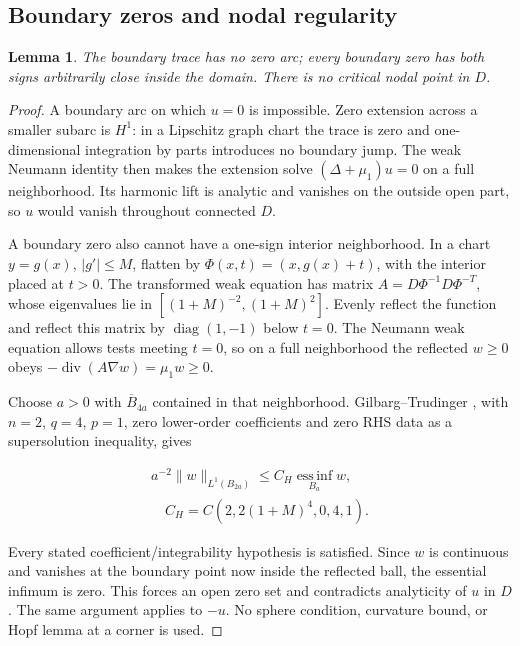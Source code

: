 \documentclass[11pt]{article}
\newtheorem{lemma}[theorem]{Lemma}
\theoremstyle{definition}
\theoremstyle{remark}
\numberwithin{equation}{section}
\begin{document}
\subsection{Boundary zeros and nodal regularity}\label{subsec:12.2}
\begin{lemma}\label{lem:boundary-zeros}
The boundary trace has no zero arc; every boundary zero has both signs arbitrarily close inside the domain. There is no critical nodal point in $D$.
\end{lemma}
\begin{proof}

A boundary arc on which $u=0$ is impossible. Zero extension across a smaller subarc is $H^1$: in a Lipschitz graph chart the trace is zero and one-dimensional integration by parts introduces no boundary jump. The weak Neumann identity then makes the extension solve $(\Delta+\mu_1)u=0$ on a full neighborhood. Its harmonic lift is analytic and vanishes on the outside open part, so $u$ would vanish throughout connected $D$.

A boundary zero also cannot have a one-sign interior neighborhood. In a chart $y=g(x)$, $|g'|\le M$, flatten by $\Phi(x,t)=(x,g(x)+t)$, with the interior placed at $t>0$. The transformed weak equation has matrix $A=D\Phi^{-1}D\Phi^{-T}$, whose eigenvalues lie in $[(1+M)^{-2},(1+M)^2]$. Evenly reflect the function and reflect this matrix by $\operatorname{diag}(1,-1)$ below $t=0$. The Neumann weak equation allows tests meeting $t=0$, so on a full neighborhood the reflected $w\ge0$ obeys $-\operatorname{div}(A\nabla w)=\mu_1w\ge0$.

Choose $a>0$ with $\overline B_{4a}$ contained in that neighborhood. Gilbarg--Trudinger \cite[Theorem~8.18]{GT}, with $n=2$, $q=4$, $p=1$, zero lower-order coefficients and zero RHS data as a supersolution inequality, gives

\begin{equation}\label{eq:src-12-02}
\begin{gathered}
a^{-2}\|w\|_{L^1(B_{2a})}\le C_H\operatorname*{ess\,inf}_{B_a}w, \\
\quad C_H=C(2,2(1+M)^4,0,4,1).
\end{gathered}
\end{equation}

Every stated coefficient/integrability hypothesis is satisfied. Since $w$ is continuous and vanishes at the boundary point now inside the reflected ball, the essential infimum is zero. This forces an open zero set and contradicts analyticity of $u$ in $D$. The same argument applies to $-u$. No sphere condition, curvature bound, or Hopf lemma at a corner is used.


\end{proof}
\end{document}
